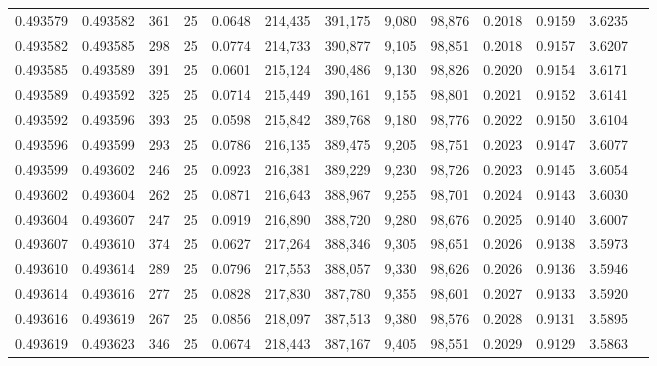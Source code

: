 \begin{tabular}{rrrrrrrrrrrrr}
0.493579 & 0.493582 &   361 &  25 &                                     0.0648 & 214,435 & 391,175 &   9,080 &  98,876 & 0.2018 & 0.9159 & 3.6235 \\
0.493582 & 0.493585 &   298 &  25 &                                     0.0774 & 214,733 & 390,877 &   9,105 &  98,851 & 0.2018 & 0.9157 & 3.6207 \\
0.493585 & 0.493589 &   391 &  25 &                                     0.0601 & 215,124 & 390,486 &   9,130 &  98,826 & 0.2020 & 0.9154 & 3.6171 \\
0.493589 & 0.493592 &   325 &  25 &                                     0.0714 & 215,449 & 390,161 &   9,155 &  98,801 & 0.2021 & 0.9152 & 3.6141 \\
0.493592 & 0.493596 &   393 &  25 &                                     0.0598 & 215,842 & 389,768 &   9,180 &  98,776 & 0.2022 & 0.9150 & 3.6104 \\
0.493596 & 0.493599 &   293 &  25 &                                     0.0786 & 216,135 & 389,475 &   9,205 &  98,751 & 0.2023 & 0.9147 & 3.6077 \\
0.493599 & 0.493602 &   246 &  25 &                                     0.0923 & 216,381 & 389,229 &   9,230 &  98,726 & 0.2023 & 0.9145 & 3.6054 \\
0.493602 & 0.493604 &   262 &  25 &                                     0.0871 & 216,643 & 388,967 &   9,255 &  98,701 & 0.2024 & 0.9143 & 3.6030 \\
0.493604 & 0.493607 &   247 &  25 &                                     0.0919 & 216,890 & 388,720 &   9,280 &  98,676 & 0.2025 & 0.9140 & 3.6007 \\
0.493607 & 0.493610 &   374 &  25 &                                     0.0627 & 217,264 & 388,346 &   9,305 &  98,651 & 0.2026 & 0.9138 & 3.5973 \\
0.493610 & 0.493614 &   289 &  25 &                                     0.0796 & 217,553 & 388,057 &   9,330 &  98,626 & 0.2026 & 0.9136 & 3.5946 \\
0.493614 & 0.493616 &   277 &  25 &                                     0.0828 & 217,830 & 387,780 &   9,355 &  98,601 & 0.2027 & 0.9133 & 3.5920 \\
0.493616 & 0.493619 &   267 &  25 &                                     0.0856 & 218,097 & 387,513 &   9,380 &  98,576 & 0.2028 & 0.9131 & 3.5895 \\
0.493619 & 0.493623 &   346 &  25 &                                     0.0674 & 218,443 & 387,167 &   9,405 &  98,551 & 0.2029 & 0.9129 & 3.5863 \\

\end{tabular}
